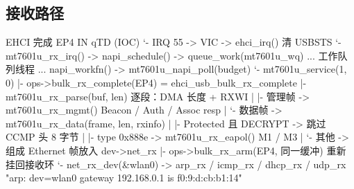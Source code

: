 \documentclass[UTF8,zihao=-4,fontset=none]{ctexart}
\begin{document}
\subsection{接收路径}
\begin{code}
EHCI 完成 EP4 IN qTD (IOC)
 `- IRQ 55 -> VIC -> ehci_irq()                         清 USBSTS
     `- mt7601u_rx_irq() -> napi_schedule() -> queue_work(mt7601u_wq)
        ... 工作队列线程 ...
        napi_workfn() -> mt7601u_napi_poll(budget)
         `- mt7601u_service(1, 0)
             |- ops->bulk_rx_complete(EP4) = ehci_usb_bulk_rx_complete
             |- mt7601u_rx_parse(buf, len)               逐段：DMA 长度 + RXWI
             |   |- 管理帧 -> mt7601u_rx_mgmt()          Beacon / Auth / Assoc resp
             |   `- 数据帧 -> mt7601u_rx_data(frame, len, rxinfo)
             |        |- Protected 且 DECRYPT -> 跳过 CCMP 头 8 字节
             |        |- type 0x888e -> mt7601u_rx_eapol()   M1 / M3
             |        `- 其他 -> 组成 Ethernet 帧放入 dev->net_rx
             |- ops->bulk_rx_arm(EP4, 同一缓冲)          重新挂回接收环
             `- net_rx_dev(&wlan0) -> arp_rx / icmp_rx / dhcp_rx / udp_rx
                    "arp: dev=wlan0 gateway 192.168.0.1 is f0:9:d:cb:b1:14"
\end{code}
\end{document}

